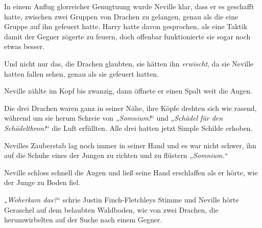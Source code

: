 In einem Anflug glorreicher Genugtuung wurde Neville klar, dass er es geschafft hatte, zwischen zwei Gruppen von Drachen zu gelangen, genau als die eine Gruppe auf ihn gefeuert hatte. Harry hatte davon gesprochen, als eine Taktik damit der Gegner zögerte zu feuern, doch offenbar funktionierte sie sogar noch etwas besser.

Und nicht nur das, die Drachen glaubten, sie hätten ihn \emph{erwischt}, da sie Neville hatten fallen sehen, genau als sie gefeuert hatten.

Neville zählte im Kopf bis zwanzig, dann öffnete er einen Spalt weit die Augen.

Die drei Drachen waren ganz in seiner Nähe, ihre Köpfe drehten sich wie rasend, während um sie herum Schreie von „\emph{Somnium!}“ und „\emph{Schädel für den Schädelthron!}“ die Luft erfüllten. Alle drei hatten jetzt Simple Schilde erhoben.

Nevilles Zauberstab lag noch immer in seiner Hand und es war nicht schwer, ihn auf die Schuhe eines der Jungen zu richten und zu flüstern „\emph{Somnium.}“

Neville schloss schnell die Augen und ließ seine Hand erschlaffen als er hörte, wie der Junge zu Boden fiel.

„\emph{Woherkam das?}“ schrie Justin Finch-Fletchleys Stimme und Neville hörte Geraschel auf dem belaubten Waldboden, wie von zwei Drachen, die herumwirbelten auf der Suche nach einem Gegner.

